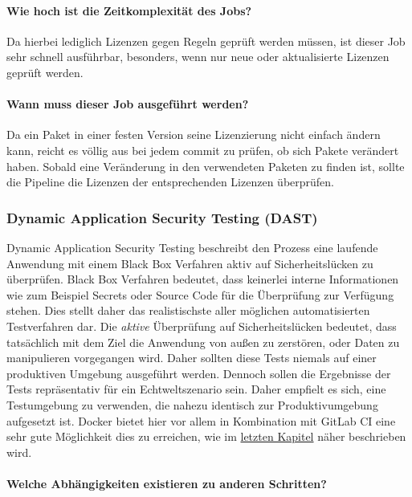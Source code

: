 \paragraph{Wie hoch ist die Zeitkomplexität des Jobs?}

Da hierbei lediglich Lizenzen gegen Regeln geprüft werden müssen, ist dieser Job sehr schnell ausführbar, besonders, wenn nur neue oder aktualisierte Lizenzen geprüft werden.

\paragraph{Wann muss dieser Job ausgeführt werden?}

Da ein Paket in einer festen Version seine Lizenzierung nicht einfach ändern kann, reicht es völlig aus bei jedem commit zu prüfen, ob sich Pakete verändert haben.
Sobald eine Veränderung in den verwendeten Paketen zu finden ist, sollte die Pipeline die Lizenzen der entsprechenden Lizenzen überprüfen.

\subsubsection{Dynamic Application Security Testing (DAST)}\label{subsubsec:dast}

Dynamic Application Security Testing beschreibt den Prozess eine laufende Anwendung mit einem Black Box Verfahren aktiv auf Sicherheitslücken zu überprüfen.
Black Box Verfahren bedeutet, dass keinerlei interne Informationen wie zum Beispiel Secrets oder Source Code für die Überprüfung zur Verfügung stehen.
Dies stellt daher das realistischste aller möglichen automatisierten Testverfahren dar.
Die \textit{aktive} Überprüfung auf Sicherheitslücken bedeutet, dass tatsächlich mit dem Ziel die Anwendung von außen zu zerstören, oder Daten zu manipulieren vorgegangen wird.
Daher sollten diese Tests niemals auf einer produktiven Umgebung ausgeführt werden.
Dennoch sollen die Ergebnisse der Tests repräsentativ für ein Echtweltszenario sein.
Daher empfielt es sich, eine Testumgebung zu verwenden, die nahezu identisch zur Produktivumgebung aufgesetzt ist.
Docker bietet hier vor allem in Kombination mit GitLab CI eine sehr gute Möglichkeit dies zu erreichen, wie im \hyperref[sec:gitlab-ci-im-einsatz-als-dast-tool]{letzten Kapitel} näher beschrieben wird.

\paragraph{Welche Abhängigkeiten existieren zu anderen Schritten?}

